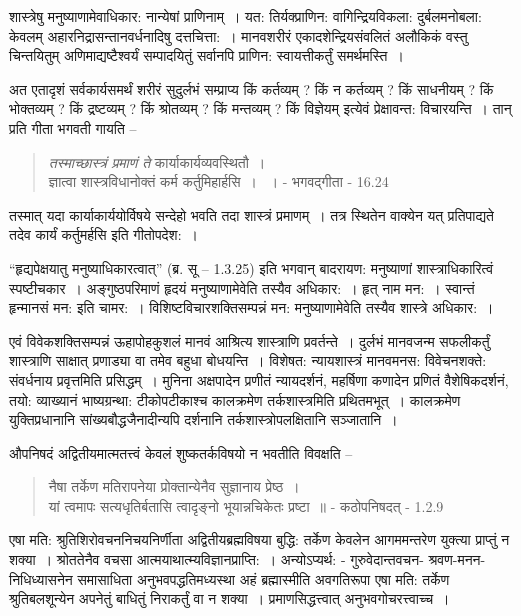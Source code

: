 {शास्त्रेषु मनुष्याणामेवाधिकार: नान्येषां प्राणिनाम्~। यत: तिर्यक्प्राणिन: वागिन्द्रियविकला: दुर्बलमनोबला: केवलम् अहारनिद्रासन्तानवर्धनादिषु दत्तचित्ता:~। मानवशरीरं एकादशेन्द्रियसंवलितं अलौकिकं वस्तु चिन्तयितुम् अणिमाद्यष्टैश्वर्यं सम्पादयितुं सर्वानपि प्राणिन: स्वायत्तीकर्तुं समर्थमस्ति~। 

अत एतादृशं सर्वकार्यसमर्थं शरीरं सुदुर्लभं सम्प्राप्य किं कर्तव्यम् ? किं न कर्तव्यम् ? किं साधनीयम् ? किं भोक्तव्यम् ? किं द्रष्टव्यम् ? किं श्रोतव्यम् ? किं मन्तव्यम् ? किं विज्ञेयम् इत्येवं प्रेक्षावन्त: विचारयन्ति~। तान् प्रति गीता भगवती गायति –
\begin{verse}
\textit{तस्माच्छास्त्रं प्रमाणं ते} कार्याकार्यव्यवस्थितौ~। \\
ज्ञात्वा शास्त्रविधानोक्तं कर्म कर्तुमिहार्हसि~। ~। - भगवद्गीता - 16.24
\end{verse}
तस्मात् यदा कार्याकार्ययोर्विषये सन्देहो भवति तदा शास्त्रं प्रमाणम्~। तत्र स्थितेन वाक्येन यत् प्रतिपाद्यते तदेव कार्यं कर्तुमर्हसि इति गीतोपदेश:~। 

“हृद्यपेक्षयातु मनुष्याधिकारत्वात्” (ब्र. सू – 1.3.25) इति भगवान् बादरायण: मनुष्याणां शास्त्राधिकारित्वं स्पष्टीचकार~। अङ्गुष्ठपरिमाणं हृदयं मनुष्याणामेवेति तस्यैव अधिकार:~। हृत् नाम मन:~। स्वान्तं हृन्मानसं मन: इति चामर:~। विशिष्टविचारशक्तिसम्पन्नं मन: मनुष्याणामेवेति तस्यैव शास्त्रे अधिकार:~। 

एवं विवेकशक्तिसम्पन्नं ऊहापोहकुशलं मानवं आश्रित्य शास्त्राणि प्रवर्तन्ते~। दुर्लभं मानवजन्म सफलीकर्तुं शास्त्राणि साक्षात् प्रणाड्या वा तमेव बहुधा बोधयन्ति~। विशेषत: न्यायशास्त्रं मानवमनस: विवेचनशक्ते: संवर्धनाय प्रवृत्तमिति प्रसिद्धम्~। मुनिना अक्षपादेन प्रणीतं न्यायदर्शनं, महर्षिणा कणादेन प्रणितं वैशेषिकदर्शनं, तयो: व्याख्यानं भाष्यग्रन्था: टीकोपटीकाश्च कालक्रमेण तर्कशास्त्रमिति प्रथितमभूत्~। कालक्रमेण युक्तिप्रधानानि सांख्यबौद्धजैनादीन्यपि दर्शनानि तर्कशास्त्रोपलक्षितानि सञ्जातानि~। 

औपनिषदं अद्वितीयमात्मतत्त्वं केवलं शुष्कतर्कविषयो न भवतीति विवक्षति –
\begin{verse}
नैषा तर्केण मतिरापनेया प्रोक्तान्येनैव सुज्ञानाय प्रेष्ठ~। \\
यां त्वमापः सत्यधृतिर्बतासि त्वादृङ्नो भूयान्नचिकेतः प्रष्टा~॥ - कठोपनिषदत् - 1.2.9
\end{verse}
एषा मति: श्रुतिशिरोवचननिचयनिर्णीता अद्वितीयब्रह्मविषया बुद्धि: तर्केण केवलेन आगममन्तरेण युक्त्या प्राप्तुं न शक्या~। श्रोततेनैव वचसा आत्मयाथात्म्यविज्ञानप्राप्ति:~। अन्योऽप्यर्थ: - गुरुवेदान्तवचन- श्रवण-मनन-निधिध्यासनेन समासाधिता अनुभवपद्धतिमध्यस्था अहं ब्रह्मास्मीति अवगतिरूपा एषा मति: तर्केण श्रुतिबलशून्येन अपनेतुं बाधितुं निराकर्तुं वा न शक्या~। प्रमाणसिद्धत्त्वात् अनुभवगोचरत्त्वाच्च~। 

}
